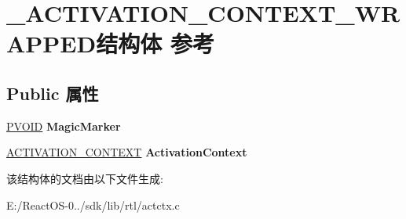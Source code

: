 \hypertarget{struct___a_c_t_i_v_a_t_i_o_n___c_o_n_t_e_x_t___w_r_a_p_p_e_d}{}\section{\+\_\+\+A\+C\+T\+I\+V\+A\+T\+I\+O\+N\+\_\+\+C\+O\+N\+T\+E\+X\+T\+\_\+\+W\+R\+A\+P\+P\+E\+D结构体 参考}
\label{struct___a_c_t_i_v_a_t_i_o_n___c_o_n_t_e_x_t___w_r_a_p_p_e_d}
\subsection*{Public 属性}
\begin{DoxyCompactItemize}
\item 
\mbox{\label{struct___a_c_t_i_v_a_t_i_o_n___c_o_n_t_e_x_t___w_r_a_p_p_e_d_af5c89ed0eaf5d60ca220bb75eaa3651d}} 
\hyperlink{interfacevoid}{P\+V\+O\+ID} {\bfseries Magic\+Marker}
\item 
\mbox{\label{struct___a_c_t_i_v_a_t_i_o_n___c_o_n_t_e_x_t___w_r_a_p_p_e_d_adadaec3c1abe64c2bad6a21343a2e9e8}} 
\hyperlink{struct___a_c_t_i_v_a_t_i_o_n___c_o_n_t_e_x_t}{A\+C\+T\+I\+V\+A\+T\+I\+O\+N\+\_\+\+C\+O\+N\+T\+E\+XT} {\bfseries Activation\+Context}
\end{DoxyCompactItemize}


该结构体的文档由以下文件生成\+:\begin{DoxyCompactItemize}
\item 
E\+:/\+React\+O\+S-\/0../sdk/lib/rtl/actctx.\+c\end{DoxyCompactItemize}
